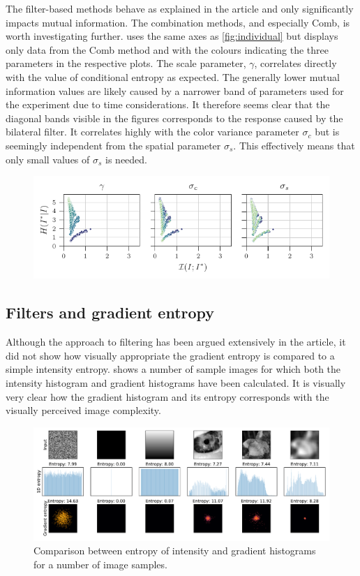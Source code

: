 The filter-based methods behave as explained in the article and only significantly impacts mutual information. The combination methods, and especially Comb, is worth investigating further.  uses the same axes as \cref{fig:individual} but displays only data from the Comb method and with the colours indicating the three parameters in the respective plots. The scale parameter, $\gamma$, correlates directly with the value of conditional entropy as expected. The generally lower mutual information values are likely caused by a narrower band of parameters used for the experiment due to time considerations. It therefore seems clear that the diagonal bands visible in the figures corresponds to the response caused by the bilateral filter. It correlates highly with the color variance parameter $\sigma_c$ but is seemingly independent from the spatial parameter $\sigma_s$. This effectively means that only small values of $\sigma_s$ is needed.

\begin{figure}
	\centering
	\includegraphics[width=1\textwidth]{figures/results/comb}
	\caption{}\label{fig:comb}
\end{figure}

\subsection{Filters and gradient entropy}
Although the approach to filtering has been argued extensively in the article, it did not show how visually appropriate the gradient entropy is compared to a simple intensity entropy.  shows a number of sample images for which both the intensity histogram and gradient histograms have been calculated. It is visually very clear how the gradient histogram and its entropy corresponds with the visually perceived image complexity.

\begin{figure}
    \centering
    \includegraphics[width=1\linewidth]{figures/results/delentropy}
    \caption{Comparison between entropy of intensity and gradient histograms for a number of image samples.}
    \label{fig:delentropy}
\end{figure}


